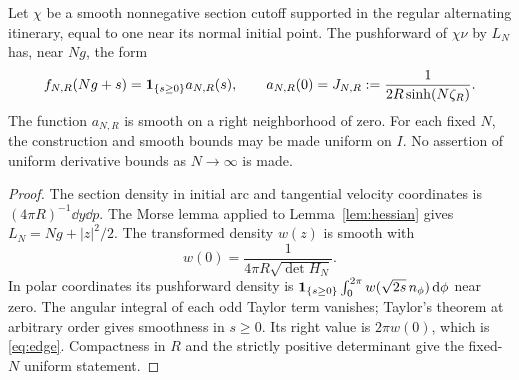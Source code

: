 \begin{theorem}\label{thm:edge}
Let $\chi$ be a smooth nonnegative section cutoff supported in the regular alternating itinerary, equal to one near its normal initial point. The pushforward of $\chi\nu$ by $L_N$ has, near $Ng$, the form
\begin{equation}\label{eq:edge}
 f_{N,R}(Ng+s)=\one_{\{s\ge0\}}a_{N,R}(s),\qquad
 a_{N,R}(0)=J_{N,R}:=\frac1{2R\sinh(N\zeta_R)}.
\end{equation}
The function $a_{N,R}$ is smooth on a right neighborhood of zero. For each fixed $N$, the construction and smooth bounds may be made uniform on $I$. No assertion of uniform derivative bounds as $N\to\infty$ is made.
\end{theorem}
\begin{proof}
The section density in initial arc and tangential velocity coordinates is $(4\pi R)^{-1}\dd y\dd p$. The Morse lemma applied to Lemma~\ref{lem:hessian} gives $L_N=Ng+|z|^2/2$. The transformed density $w(z)$ is smooth with
\[
 w(0)=\frac1{4\pi R\sqrt{\det H_N}}.
\]
In polar coordinates its pushforward density is
$\mathbf1_{\{s\ge0\}}\int_0^{2\pi}w(\sqrt{2s}\,n_\phi)\,\mathrm d\phi$ near zero. The angular integral of each odd Taylor term vanishes; Taylor's theorem at arbitrary order gives smoothness in $s\ge0$. Its right value is $2\pi w(0)$, which is \eqref{eq:edge}. Compactness in $R$ and the strictly positive determinant give the fixed-$N$ uniform statement.
\end{proof}

